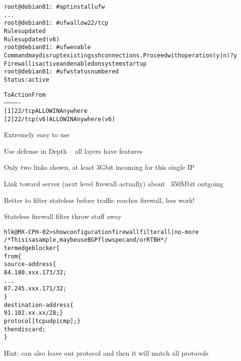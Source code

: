 \documentclass[Screen16to9,17pt]{foils}
\begin{document}

\begin{alltt}\small
root@debian01:~# apt install ufw
...
root@debian01:~# ufw allow 22/tcp
Rules updated
Rules updated (v6)
root@debian01:~# ufw enable
Command may disrupt existing ssh connections. Proceed with operation (y|n)? y
Firewall is active and enabled on system startup
root@debian01:~# ufw status numbered
Status: active

     To                         Action      From
     --                         ------      ----
[ 1] 22/tcp                     ALLOW IN    Anywhere
[ 2] 22/tcp (v6)                ALLOW IN    Anywhere (v6)
\end{alltt}

\begin{list2}
\item Extremely easy to use
\end{list2}





\centerline{Use defense in Depth -- all layers have features}




\centerline{Only two links shown, at least 3Gbit incoming for this single IP}

\centerline{Link toward server (next level firewall actually) about ~350Mbit outgoing}

Better to filter stateless before traffic reaches firewall, less work!



Stateless firewall filter throw stuff away

\begin{alltt}\footnotesize
hlk@MX-CPH-02> show configuration firewall filter all | no-more
/* This is a sample, maybe use BGP flowspec and/or RTBH */
term edgeblocker \{
    from \{
        source-address \{
            84.180.xxx.173/32;
...
            87.245.xxx.171/32;
        \}
        destination-address \{
            91.102.xx.xx/28; \}
        protocol [ tcp udp icmp ]; \}
    then discard;
\}
\end{alltt}
Hint: can also leave out protocol and then it will match all protocols
\end{document}
